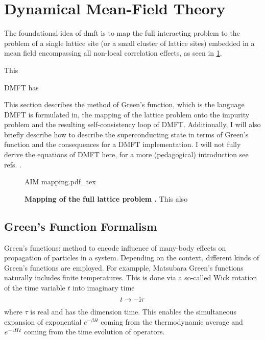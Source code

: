 \documentclass[../notes.tex]{subfiles}
\begin{document}



\section{Dynamical Mean-Field Theory}\label{sec:Dynamical Mean-Field Theory}

The foundational idea of \acrfull{dmft} is to map the full interacting problem to the problem of a single lattice site (or a small cluster of lattice sites) embedded in a mean field encompassing all non-local correlation effects, as seen in \cref{fig:DMFT AIM mapping}.

This 


DMFT has

	
This section describes the method of Green's function, which is the language DMFT is formulated in, the mapping of the lattice problem onto the impurity problem and the resulting self-consistency loop of DMFT.
Additionally, I will also briefly describe how to describe the superconducting state in terms of Green's function and the consequences for a DMFT implementation.
I will not fully derive the equations of DMFT here, for a more (pedagogical) introduction see refs. \cite{pavariniDynamicalMeanfieldTheory2022, georgesDynamicalMeanfieldTheory1996, colemanIntroductionManyBodyPhysics2015, bruusManyBodyQuantumTheory2004}.

\begin{figure}[t]
	\centering
	{AIM mapping.pdf_tex}
	\caption{\textbf{Mapping of the full lattice problem .} This also }
	\label{fig:DMFT AIM mapping}
\end{figure}

\subsection*{Green's Function Formalism}

Green's functions: method to encode influence of many-body effects on propagation of particles in a system.
Depending on the context, different kinds of Green's functions are employed.
For exampple, Matsubara Green's functions naturally includes finite temperatures.
This is done via a so-called Wick rotation of the time variable \(t\) into imaginary time
\begin{equation}
	t \to -\mathrm{i} \tau
\end{equation}
where \(\tau\) is real and has the dimension time.
This enables the simultaneous expansion of exponential \(e^{-\beta H}\) coming from the thermodynamic average and \(e^{-\mathrm{i} H t}\) coming from the time evolution of operators.
\end{document}
